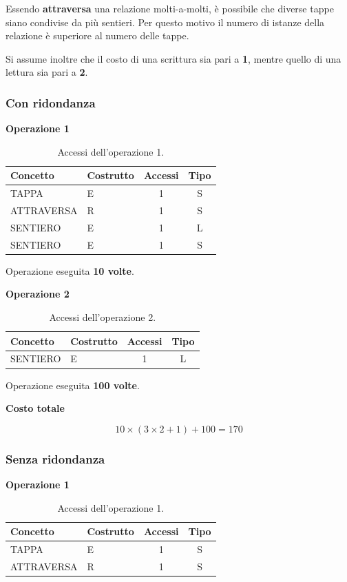 \documentclass[10pt, a4paper]{article}
\begin{document}
Essendo \textbf{attraversa} una relazione molti-a-molti, è possibile che diverse tappe siano condivise da più sentieri. Per questo motivo il numero di istanze della relazione è superiore al numero delle tappe.

Si assume inoltre che il costo di una scrittura sia pari a \textbf{1}, mentre quello di una lettura sia pari a \textbf{2}.

\subsubsection{Con ridondanza}

\textbf{Operazione 1}

\begin{table}[h]
\centering
\begin{tabular}{l l c c}
\toprule
Concetto & Costrutto & Accessi & Tipo \\
\midrule
TAPPA & E & 1 & S \\
ATTRAVERSA & R & 1 & S \\
SENTIERO & E & 1 & L \\
SENTIERO & E & 1 & S \\
\bottomrule
\end{tabular}
\caption{Accessi dell'operazione 1.}
\end{table}

Operazione eseguita \textbf{10 volte}. 

\textbf{Operazione 2}

\begin{table}[h]
\centering
\begin{tabular}{l l c c}
\toprule
Concetto & Costrutto & Accessi & Tipo \\
\midrule
SENTIERO & E & 1 & L \\
\bottomrule
\end{tabular}
\caption{Accessi dell'operazione 2.}
\end{table}

Operazione eseguita \textbf{100 volte}.

\textbf{Costo totale}

\[
10 \times (3 \times 2 + 1) + 100 = 170
\]

\subsubsection{Senza ridondanza}

\textbf{Operazione 1}

\begin{table}[h]
\centering
\begin{tabular}{l l c c}
\toprule
Concetto & Costrutto & Accessi & Tipo \\
\midrule
TAPPA & E & 1 & S \\
ATTRAVERSA & R & 1 & S \\
\bottomrule
\end{tabular}
\caption{Accessi dell'operazione 1.}
\end{table}
\end{document}
